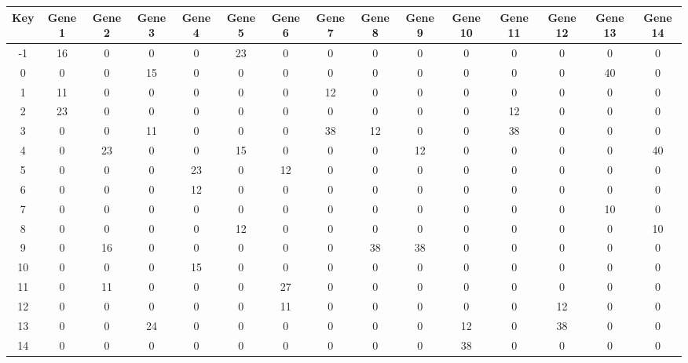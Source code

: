 \begin{tabular}{|c|c|c|c|c|c|c|c|c|c|c|c|c|c|c|}
\hline
Key & Gene 1 & Gene 2 & Gene 3 & Gene 4 & Gene 5 & Gene 6 & Gene 7 & Gene 8 & Gene 9 & Gene 10 & Gene 11 & Gene 12 & Gene 13 & Gene 14 \\
\hline
-1 & 16 & 0 & 0 & 0 & 23 & 0 & 0 & 0 & 0 & 0 & 0 & 0 & 0 & 0 \\
0 & 0 & 0 & 15 & 0 & 0 & 0 & 0 & 0 & 0 & 0 & 0 & 0 & 40 & 0 \\
1 & 11 & 0 & 0 & 0 & 0 & 0 & 12 & 0 & 0 & 0 & 0 & 0 & 0 & 0 \\
2 & 23 & 0 & 0 & 0 & 0 & 0 & 0 & 0 & 0 & 0 & 12 & 0 & 0 & 0 \\
3 & 0 & 0 & 11 & 0 & 0 & 0 & 38 & 12 & 0 & 0 & 38 & 0 & 0 & 0 \\
4 & 0 & 23 & 0 & 0 & 15 & 0 & 0 & 0 & 12 & 0 & 0 & 0 & 0 & 40 \\
5 & 0 & 0 & 0 & 23 & 0 & 12 & 0 & 0 & 0 & 0 & 0 & 0 & 0 & 0 \\
6 & 0 & 0 & 0 & 12 & 0 & 0 & 0 & 0 & 0 & 0 & 0 & 0 & 0 & 0 \\
7 & 0 & 0 & 0 & 0 & 0 & 0 & 0 & 0 & 0 & 0 & 0 & 0 & 10 & 0 \\
8 & 0 & 0 & 0 & 0 & 12 & 0 & 0 & 0 & 0 & 0 & 0 & 0 & 0 & 10 \\
9 & 0 & 16 & 0 & 0 & 0 & 0 & 0 & 38 & 38 & 0 & 0 & 0 & 0 & 0 \\
10 & 0 & 0 & 0 & 15 & 0 & 0 & 0 & 0 & 0 & 0 & 0 & 0 & 0 & 0 \\
11 & 0 & 11 & 0 & 0 & 0 & 27 & 0 & 0 & 0 & 0 & 0 & 0 & 0 & 0 \\
12 & 0 & 0 & 0 & 0 & 0 & 11 & 0 & 0 & 0 & 0 & 0 & 12 & 0 & 0 \\
13 & 0 & 0 & 24 & 0 & 0 & 0 & 0 & 0 & 0 & 12 & 0 & 38 & 0 & 0 \\
14 & 0 & 0 & 0 & 0 & 0 & 0 & 0 & 0 & 0 & 38 & 0 & 0 & 0 & 0 \\
\hline
\end{tabular}